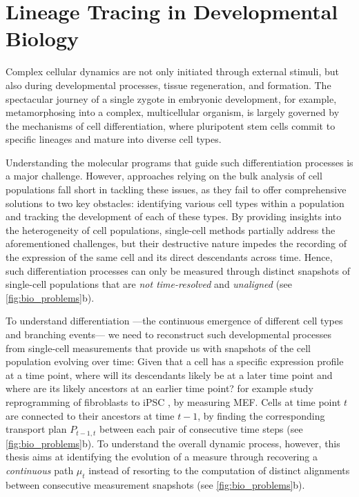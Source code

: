 \section{Lineage Tracing in Developmental Biology}
\label{sec:cell_differentiation}

Complex cellular dynamics are not only initiated through external stimuli, but also during developmental processes, tissue regeneration, and formation.
The spectacular journey of a single zygote in embryonic development, for example, metamorphosing into a complex, multicellular organism, is largely governed by the mechanisms of cell differentiation, where pluripotent stem cells commit to specific lineages and mature into diverse cell types.

Understanding the molecular programs that guide such differentiation processes is a major challenge.
However, approaches relying on the bulk analysis of cell populations fall short in tackling these issues, as they fail to offer comprehensive solutions to two key obstacles: identifying various cell types within a population and tracking the development of each of these types.
By providing insights into the heterogeneity of cell populations, single-cell methods partially address the aforementioned challenges, but their destructive nature impedes the recording of the expression of the same cell and its direct descendants across time.
Hence, such differentiation processes can only be measured through distinct snapshots of single-cell populations that are \textit{not time-resolved} and \textit{unaligned} (see \cref{fig:bio_problems}b).

To understand differentiation ---the continuous emergence of different cell types and branching events--- we need to reconstruct such developmental processes from single-cell measurements that provide us with snapshots of the cell population evolving over time:
Given that a cell has a specific expression profile at a time point, where will its descendants likely be at a later time point and where are its likely ancestors at an earlier time point? 
\citet{schiebinger2019optimal} for example study reprogramming of fibroblasts to \acrfull{iPSC} \citep{takahashi2006induction}, by measuring \acrfull{MEF}. Cells at time point $t$ are connected to their ancestors at time $t-1$, by finding the corresponding transport plan $P_{t-1,t}$ between each pair of consecutive time steps (see \cref{fig:bio_problems}b).
To understand the overall dynamic process, however, this thesis aims at identifying the evolution of a measure through recovering a \emph{continuous} path $\mu_t$ instead of resorting to the computation of distinct alignments between consecutive measurement snapshots \citep{lavenant2021towards} (see \cref{fig:bio_problems}b).

